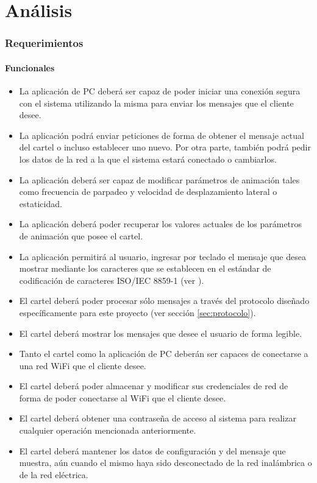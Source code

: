 \part{Análisis}\label{part:analisis}
\section{Requerimientos}
\subsection{Funcionales}
\begin{itemize}
	\item La aplicación de PC deberá ser capaz de poder iniciar una conexión segura con el sistema utilizando la misma para enviar los mensajes que el cliente desee.
	\item La aplicación podrá enviar peticiones de forma de obtener el mensaje actual del cartel o incluso establecer uno nuevo. Por otra parte, también podrá pedir los datos de la red a la que el sistema estará conectado o cambiarlos.
	\item La aplicación deberá ser capaz de modificar parámetros de animación tales como frecuencia de parpadeo y velocidad de desplazamiento lateral o estaticidad.
	\item La aplicación deberá poder recuperar los valores actuales de los parámetros de animación que posee el cartel.
	\item La aplicación permitirá al usuario, ingresar por teclado el mensaje que desea mostrar mediante los caracteres que se establecen en el estándar de codificación de caracteres ISO/IEC 8859-1 (ver \cite{CodifChar}).
	\item El cartel deberá poder procesar sólo mensajes a través del protocolo diseñado específicamente para este proyecto (ver sección \ref{sec:protocolo}).
	\item El cartel deberá mostrar los mensajes que desee el usuario de forma legible.
	\item Tanto el cartel como la aplicación de PC deberán ser capaces de conectarse a una red WiFi que el cliente desee.
	\item El cartel deberá poder almacenar y modificar sus credenciales de red de forma de poder conectarse al WiFi que el cliente desee.
	\item El cartel deberá obtener una contraseña de acceso al sistema para realizar cualquier operación mencionada anteriormente.
	\item El cartel deberá mantener los datos de configuración y del mensaje que muestra, aún cuando el mismo haya sido desconectado de la red inalámbrica o de la red eléctrica.

\end{itemize}
